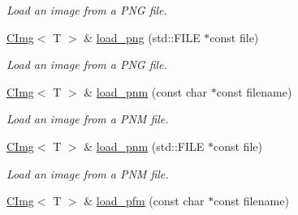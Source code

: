 \begin{DoxyCompactItemize}
\begin{DoxyCompactList}\small\item\em Load an image from a PNG file. \item\end{DoxyCompactList}\item 
\hypertarget{structcimg__library_1_1CImg_a1e2f8278de4d5ab4994d4b4261ec7849}{
\hyperlink{structcimg__library_1_1CImg}{CImg}$<$ T $>$ \& \hyperlink{structcimg__library_1_1CImg_a1e2f8278de4d5ab4994d4b4261ec7849}{load\_\-png} (std::FILE $\ast$const file)}
\label{structcimg__library_1_1CImg_a1e2f8278de4d5ab4994d4b4261ec7849}

\begin{DoxyCompactList}\small\item\em Load an image from a PNG file. \item\end{DoxyCompactList}\item 
\hypertarget{structcimg__library_1_1CImg_aa104737d62b54c15489b481a199fb72a}{
\hyperlink{structcimg__library_1_1CImg}{CImg}$<$ T $>$ \& \hyperlink{structcimg__library_1_1CImg_aa104737d62b54c15489b481a199fb72a}{load\_\-pnm} (const char $\ast$const filename)}
\label{structcimg__library_1_1CImg_aa104737d62b54c15489b481a199fb72a}

\begin{DoxyCompactList}\small\item\em Load an image from a PNM file. \item\end{DoxyCompactList}\item 
\hypertarget{structcimg__library_1_1CImg_afbd522d5faf3995d32f04081a9d81b70}{
\hyperlink{structcimg__library_1_1CImg}{CImg}$<$ T $>$ \& \hyperlink{structcimg__library_1_1CImg_afbd522d5faf3995d32f04081a9d81b70}{load\_\-pnm} (std::FILE $\ast$const file)}
\label{structcimg__library_1_1CImg_afbd522d5faf3995d32f04081a9d81b70}

\begin{DoxyCompactList}\small\item\em Load an image from a PNM file. \item\end{DoxyCompactList}\item 
\hypertarget{structcimg__library_1_1CImg_ad0dfcaee54123e2a7f2747ae212b7476}{
\hyperlink{structcimg__library_1_1CImg}{CImg}$<$ T $>$ \& \hyperlink{structcimg__library_1_1CImg_ad0dfcaee54123e2a7f2747ae212b7476}{load\_\-pfm} (const char $\ast$const filename)}
\label{structcimg__library_1_1CImg_ad0dfcaee54123e2a7f2747ae212b7476}


\end{DoxyCompactItemize}
